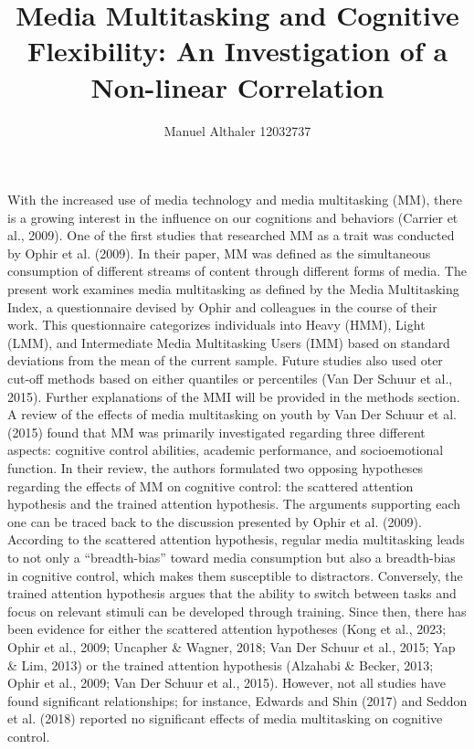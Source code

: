 \documentclass[
  man]{apa7}
\title{Media Multitasking and Cognitive Flexibility: An Investigation of a Non-linear Correlation}
\author{Manuel Althaler 12032737\textsuperscript{}}
\date{}
\affiliation{\vspace{0.5cm}\textsuperscript{} Faculty of Psychology, University of Vienna, 200233 SE Bachelorarbeit (2024S), Bence Szaszkó BSc MA MSc}
\begin{document}
\maketitle

With the increased use of media technology and media multitasking (MM), there is a growing interest in the influence on our cognitions and behaviors (Carrier et al., 2009). One of the first studies that researched MM as a trait was conducted by Ophir et al. (2009). In their paper, MM was defined as the simultaneous consumption of different streams of content through different forms of media. The present work examines media multitasking as defined by the Media Multitasking Index, a questionnaire devised by Ophir and colleagues in the course of their work. This questionnaire categorizes individuals into Heavy (HMM), Light (LMM), and Intermediate Media Multitasking Users (IMM) based on standard deviations from the mean of the current sample. Future studies also used oter cut-off methods based on either quantiles or percentiles (Van Der Schuur et al., 2015). Further explanations of the MMI will be provided in the methods section. A review of the effects of media multitasking on youth by Van Der Schuur et al. (2015) found that MM was primarily investigated regarding three different aspects: cognitive control abilities, academic performance, and socioemotional function. In their review, the authors formulated two opposing hypotheses regarding the effects of MM on cognitive control: the scattered attention hypothesis and the trained attention hypothesis. The arguments supporting each one can be traced back to the discussion presented by Ophir et al. (2009). According to the scattered attention hypothesis, regular media multitasking leads to not only a ``breadth-bias'' toward media consumption but also a breadth-bias in cognitive control, which makes them susceptible to distractors. Conversely, the trained attention hypothesis argues that the ability to switch between tasks and focus on relevant stimuli can be developed through training. Since then, there has been evidence for either the scattered attention hypotheses (Kong et al., 2023; Ophir et al., 2009; Uncapher \& Wagner, 2018; Van Der Schuur et al., 2015; Yap \& Lim, 2013) or the trained attention hypothesis (Alzahabi \& Becker, 2013; Ophir et al., 2009; Van Der Schuur et al., 2015). However, not all studies have found significant relationships; for instance, Edwards and Shin (2017) and Seddon et al. (2018) reported no significant effects of media multitasking on cognitive control.
\end{document}
